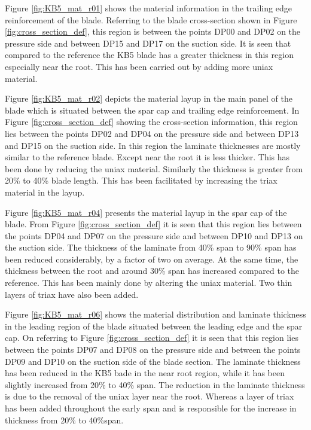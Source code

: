 Figure \ref{fig:KB5_mat_r01} shows the material information in the trailing edge reinforcement of the blade. Referring to the blade cross-section shown in Figure \ref{fig:cross_section_def}, this region is between the points DP00 and DP02 on the pressure side and between DP15 and DP17 on the suction side. It is seen that compared to the reference the KB5 blade has a greater thickness in this region especially near the root. This has been carried out by adding more uniax material.

Figure \ref{fig:KB5_mat_r02} depicts the material layup in the main panel of the blade which is situated between the spar cap and trailing edge reinforcement. In Figure \ref{fig:cross_section_def} showing the cross-section information, this region lies between the points DP02 and DP04 on the pressure side and between DP13 and DP15 on the suction side. In this region the laminate thicknesses are mostly similar to the reference blade. Except near the root it is less thicker. This has been done by reducing the uniax material. Similarly the thickness is greater from 20\% to 40\% blade length. This has been facilitated by increasing the triax material in the layup. 

Figure \ref{fig:KB5_mat_r04} presents the material layup in the spar cap of the blade. From Figure \ref{fig:cross_section_def} it is seen that this region lies between the points DP04 and DP07 on the pressure side and between DP10 and DP13 on the suction side. The thickness of the laminate from 40\% span to 90\% span has been reduced considerably, by a factor of two on average. At the same time, the thickness between the root and around 30\% span has increased compared to the reference. This has been mainly done by altering the uniax material. Two thin layers of triax have also been added.

Figure \ref{fig:KB5_mat_r06} shows the material distribution and laminate thickness in the leading region of the blade situated between the leading edge and the spar cap. On referring to Figure \ref{fig:cross_section_def} it is seen that this region lies between the points DP07 and DP08 on the pressure side and between the points DP09 and DP10 on the suction side of the blade section. The laminate thickness has been reduced in the KB5 bade in the near root region, while it has been slightly increased from 20\% to 40\% span. The reduction in the laminate thickness is due to the removal of the uniax layer near the root. Whereas a layer of triax has been added throughout the early span and is responsible for the increase in thickness from 20\% to 40\%span.

